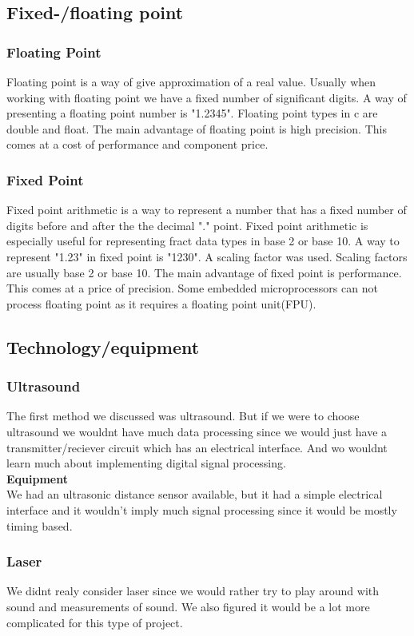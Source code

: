 \subsection{Fixed-/floating point}
\subsubsection{Floating Point}
Floating point is a way of give approximation of a real value. Usually when working with floating point we have a fixed number of significant digits. A way of presenting a floating point number is "1.2345". Floating point types in c are double and float. The main advantage of floating point is high precision. This comes at a cost of performance and component price.
\subsubsection{Fixed Point}
Fixed point arithmetic is a way to represent a number that has a fixed number of digits before and after the the decimal "." point. Fixed point arithmetic is especially useful for representing fract data types in base 2 or base 10. A way to represent "1.23" in fixed point is "1230". A scaling factor was used. Scaling factors are usually base 2 or base 10. The main advantage of fixed point is performance. This comes at a price of precision. Some embedded microprocessors can not process floating point as it requires a floating point unit(FPU).\\

\subsection{Technology/equipment}
\subsubsection{Ultrasound}
The first method we discussed was ultrasound. But if we were to choose ultrasound we wouldnt have much data processing since we would just have a transmitter/reciever circuit which has an electrical interface. And wo wouldnt learn much about implementing digital signal processing.\\
\textbf{Equipment}\\
We had an ultrasonic distance sensor available, but it had a simple electrical interface and it wouldn't imply much signal processing since it would be mostly timing based.
\subsubsection{Laser}
We didnt realy consider laser since we would rather try to play around with sound and measurements of sound. We also figured it would be a lot more complicated for this type of project.
